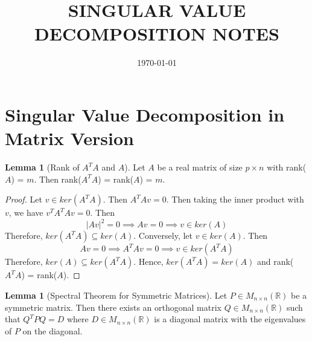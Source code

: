 \documentclass[letterpaper, 11pt]{article}
\newcommand{\R}{\mathbb{R}}   %
\newcommand{\1}{\mathds{1}}		%
\theoremstyle{definition}
\newtheorem{lemma}[theorem]{Lemma}
\begin{document}

\title{\normalsize\MakeUppercase{\bfseries 
Singular Value Decomposition Notes}}
\date{\footnotesize\MakeUppercase\today}
\maketitle
\vspace{-1cm}


% 
% 

\section{Singular Value Decomposition in Matrix Version}

\begin{lemma}[Rank of $A^T A$ and $A$]
  Let $A$ be a real matrix of size $p \times n$ with rank($A$) = $m$. Then rank($A^T A$) = rank($A$) = $m$.
\end{lemma}
\begin{proof}
  Let $v \in ker(A^T A)$. Then $A^T A v = 0$. Then taking the inner product with $v$, we have $v^T A^T A v = 0$. Then 
  \[
    | Av |^2 = 0 \implies Av = 0 \implies v \in ker(A)
  \] 
  Therefore, $ker(A^T A) \subseteq ker(A)$. Conversely, let $v \in ker(A)$. Then 
  \[
    Av = 0 \implies A^T A v = 0 \implies v \in ker(A^T A)
  \] 
  Therefore, $ker(A) \subseteq ker(A^T A)$. Hence, $ker(A^T A) = ker(A)$ and rank($A^T A$) = rank($A$).
\end{proof}

\begin{lemma}[Spectral Theorem for Symmetric Matrices]\label{lem:spectral_theorem_for_symmetric_matrices}
  Let $P \in M_{n \times n}(\R)$ be a symmetric matrix. Then there exists an orthogonal matrix $Q \in M_{n \times n}(\R)$ such that $Q^T P Q = D$ where $D \in M_{n \times n}(\R)$ is a diagonal matrix with the eigenvalues of $P$ on the diagonal.
\end{lemma}
\end{document}
